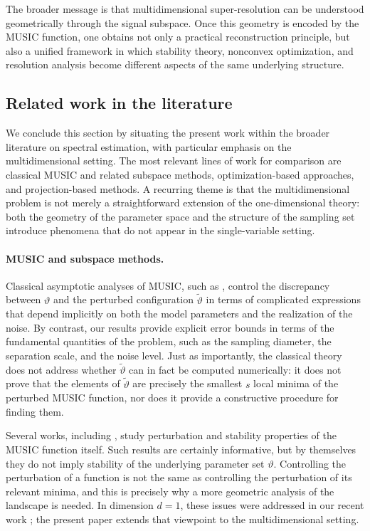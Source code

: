 \documentclass[11pt]{article}
\theoremstyle{definition}
\numberwithin{theorem}{section}
\numberwithin{lemma}{section}
\numberwithin{equation}{section}
\renewcommand{\tilde}{\widetilde}
\numberwithin{equation}{section}
\begin{document}
The broader message is that multidimensional super-resolution can be understood geometrically through the signal subspace. Once this geometry is encoded by the MUSIC function, one obtains not only a practical reconstruction principle, but also a unified framework in which stability theory, nonconvex optimization, and resolution analysis become different aspects of the same underlying structure.

\subsection{Related work in the literature}
\label{sec:relatedwork}

We conclude this section by situating the present work within the broader literature on spectral estimation, with particular emphasis on the multidimensional setting. The most relevant lines of work for comparison are classical MUSIC and related subspace methods, optimization-based approaches, and projection-based methods. A recurring theme is that the multidimensional problem is not merely a straightforward extension of the one-dimensional theory: both the geometry of the parameter space and the structure of the sampling set introduce phenomena that do not appear in the single-variable setting.

\paragraph{MUSIC and subspace methods.}
Classical asymptotic analyses of MUSIC, such as \cite{stoica1989music}, control the discrepancy between $\vartheta$ and the perturbed configuration $\tilde\vartheta$ in terms of complicated expressions that depend implicitly on both the model parameters and the realization of the noise. By contrast, our results provide explicit error bounds in terms of the fundamental quantities of the problem, such as the sampling diameter, the separation scale, and the noise level. Just as importantly, the classical theory does not address whether $\tilde\vartheta$ can in fact be computed numerically: it does not prove that the elements of $\tilde\vartheta$ are precisely the smallest $s$ local minima of the perturbed MUSIC function, nor does it provide a constructive procedure for finding them.

Several works, including \cite{liao2016music,liao2015multi,li2021stable}, study perturbation and stability properties of the MUSIC function itself. Such results are certainly informative, but by themselves they do not imply stability of the underlying parameter set $\vartheta$. Controlling the perturbation of a function is not the same as controlling the perturbation of its relevant minima, and this is precisely why a more geometric analysis of the landscape is needed. In dimension $d=1$, these issues were addressed in our recent work \cite{fannjiang2025optimality}; the present paper extends that viewpoint to the multidimensional setting.
\end{document}
